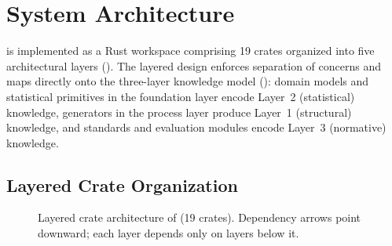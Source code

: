 \section{System Architecture}
\label{sec:architecture}

\system{} is implemented as a Rust workspace comprising 19 crates
organized into five architectural layers ().  The
layered design enforces separation of concerns and maps directly onto
the three-layer knowledge model (): domain models
and statistical primitives in the foundation layer encode Layer~2
(statistical) knowledge, generators in the process layer produce Layer~1
(structural) knowledge, and standards and evaluation modules encode
Layer~3 (normative) knowledge.

\subsection{Layered Crate Organization}
\label{sec:arch_layers}

\begin{figure}[t]
\centering
{}
\caption{Layered crate architecture of \system{} (19 crates).
  Dependency arrows point downward; each layer depends only on layers
  below it.}
\label{fig:architecture}
\end{figure}

